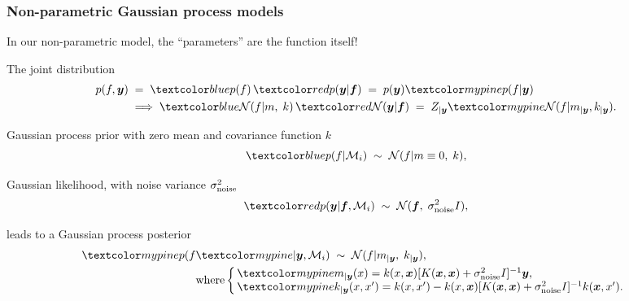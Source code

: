 \begin{frame}
\frametitle{Non-parametric Gaussian process models}

In our non-parametric model, the ``parameters'' are the function itself!

The joint distribution
\[
  \begin{split}
    p(f,\bfy)\;&=\;\Blue{p(f)}\,\Red{p(\bfy|\bff)}\;=\;p(\bfy)\Green{p(f|\bfy)}\\
    &\Longrightarrow\;\Blue{{\cal N}(f|m,\;k)}\,\Red{{\cal
        N}(\bfy|\bff)}\;=\;
    Z_{|\bfy}\Green{{\cal N}(f|m_{|\bfy},k_{|\bfy})}.
    \end{split}
\]

Gaussian process prior with zero mean and covariance function $k$
\[
\Blue{p(f|\mathcal{M}_i)\;\sim\;{\cal N}(f|m\equiv 0,\;k),}
\]

Gaussian likelihood, with noise variance $\sigma_{\rm noise}^2$
\[
\Red{p(\bfy|\bff, \mathcal{M}_i)\;\sim\;
{\cal N}(\bff,\;\sigma^2_{\rm noise}I),}
\]


leads to a Gaussian process posterior
\[
\begin{split}
\Green{p(f}&\Green{|\bfy, \mathcal{M}_i)\;\sim\;{\cal
  N}(f|m_{|\bfy},\;k_{|\bfy}),}\\
&\text{where}\left\{\!\!\begin{array}{l}\Green{m_{|\bfy}(x)=k(x,\bfx)[K(\bfx,\bfx)+\sigma_{\rm noise}^2I]^{-1}\bfy,}\\
\Green{k_{|\bfy}(x,x')=k(x,x')-k(x,\bfx)[K(\bfx,\bfx)+\sigma^2_{\rm noise}I]^{-1}k(\bfx,x').}\end{array}\right.
\end{split}
\]
\end{frame}

